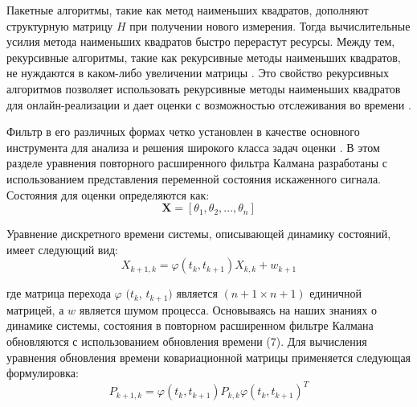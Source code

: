 Пакетные алгоритмы, такие как метод наименьших квадратов, дополняют структурную матрицу $H$ при получении нового измерения. Тогда вычислительные усилия метода наименьших квадратов быстро перерастут ресурсы. Между тем, рекурсивные алгоритмы, такие как рекурсивные методы наименьших квадратов, не нуждаются в каком-либо увеличении матрицы \cite{6574296, bettayeb1998recursive}. Это свойство рекурсивных алгоритмов позволяет использовать рекурсивные методы наименьших квадратов для онлайн-реализации и дает оценки с возможностью отслеживания во времени \cite{bettayeb1998recursive}.

Фильтр  в его различных формах четко установлен в качестве основного инструмента для анализа и решения широкого класса задач оценки \cite{simon2006optimal}. В этом разделе уравнения повторного расширенного фильтра Калмана разработаны с использованием представления переменной состояния искаженного сигнала. Состояния для оценки определяются как:
\begin{equation}
\label{eq:equation1.25}	
	\textbf{X} = [\theta_{1}, \theta_{2},..., \theta_{n}]
\end{equation}

Уравнение дискретного времени системы, описывающей динамику состояний, имеет следующий вид:
\begin{equation}
\label{eq:equation1.26}	
	X_{k+1,k} = \varphi (t_{k},t_{k+1}) X_{k,k}+ w_{k+1}
\end{equation}

где матрица перехода $\varphi$ $(t_{k}$, $t_{k + 1})$ является $(n + 1 \times n + 1)$ единичной матрицей, а $w$ является шумом процесса. Основываясь на наших знаниях о динамике системы, состояния в повторном расширенном фильтре Калмана обновляются с использованием обновления времени (7). Для вычисления уравнения обновления времени ковариационной матрицы применяется следующая формулировка:
\begin{equation}
\label{eq:equation1.27}	
	P_{k+1,k} = \varphi (t_{k},t_{k+1}) P_{k,k} \varphi (t_{k},t_{k+1})^{T}
\end{equation}

